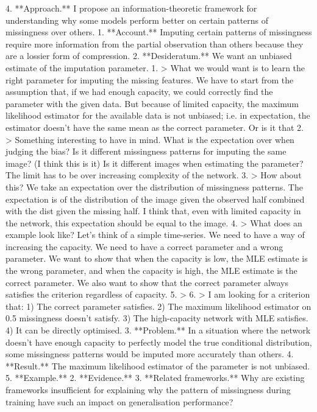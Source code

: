 \documentclass[a4paper,12pt,twoside,openright]{article}
\begin{document}
4. **Approach.** I propose an information-theoretic framework for understanding why some models perform better on certain patterns of missingness over others.
   1. **Account.** Imputing certain patterns of missingness require more information from the partial observation than others because they are a lossier form of compression.
      2. **Desideratum.** We want an unbiased estimate of the imputation parameter.
         1. > What we would want is to learn the right parameter for imputing the missing features. We have to start from the assumption that, if we had enough capacity, we could correctly find the parameter with the given data. But because of limited capacity, the maximum likelihood estimator for the available data is not unbiased; i.e. in expectation, the estimator doesn't have the same mean as the correct parameter. Or is it that
         2. > Something interesting to have in mind. What is the expectation over when judging the bias? Is it different missingness patterns for imputing the same image? (I think this is it) Is it different images when estimating the parameter? The limit has to be over increasing complexity of the network.
         3. > How about this? We take an expectation over the distribution of missingness patterns. The expectation is of the distribution of the image given the observed half combined with the dist given the missing half. I think that, even with limited capacity in the network, this expectation should be equal to the image.
         4. > What does an example look like? Let's think of a simple time-series. We need to have a way of increasing the capacity. We need to have a correct parameter and a wrong parameter. We want to show that when the capacity is low, the MLE estimate is the wrong parameter, and when the capacity is high, the MLE estimate is the correct parameter. We also want to show that the correct parameter always satisfies the criterion regardless of capacity.
         5. > 
         6. > I am looking for a criterion that: 1) The correct parameter satisfies. 2) The maximum likelihood estimator on 0.5 missingness doesn't satisfy. 3) The high-capacity network with MLE satisfies. 4) It can be directly optimised.
      3. **Problem.** In a situation where the network doesn't have enough capacity to perfectly model the true conditional distribution, some missingness patterns would be imputed more accurately than others.
      4. **Result.** The maximum likelihood estimator of the parameter is not unbiased. 
      5. **Example.**
   2. **Evidence.**
   3. **Related frameworks.** Why are existing frameworks insufficient for explaining why the pattern of missingness during training have such an impact on generalisation performance?
\end{document}
